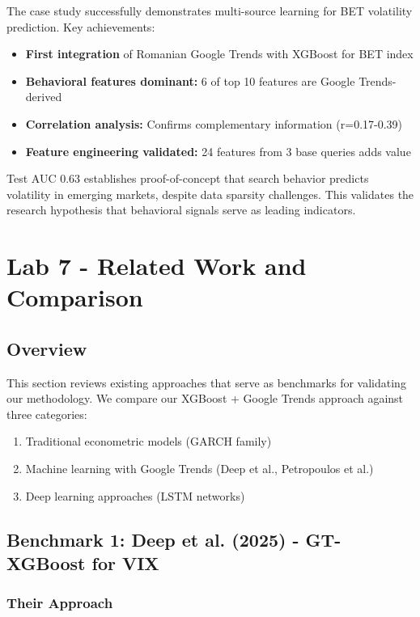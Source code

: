 \documentclass[12pt,a4paper]{article}
\begin{document}
The case study successfully demonstrates multi-source learning for BET volatility prediction. Key achievements:

\begin{itemize}
    \item \textbf{First integration} of Romanian Google Trends with XGBoost for BET index
    \item \textbf{Behavioral features dominant:} 6 of top 10 features are Google Trends-derived
    \item \textbf{Correlation analysis:} Confirms complementary information (r=0.17-0.39)
    \item \textbf{Feature engineering validated:} 24 features from 3 base queries adds value
\end{itemize}

Test AUC 0.63 establishes proof-of-concept that search behavior predicts volatility in emerging markets, despite data sparsity challenges. This validates the research hypothesis that behavioral signals serve as leading indicators.

\newpage
\section{Lab 7 - Related Work and Comparison}

\subsection{Overview}

This section reviews existing approaches that serve as benchmarks for validating our methodology. We compare our XGBoost + Google Trends approach against three categories:

\begin{enumerate}
    \item Traditional econometric models (GARCH family)
    \item Machine learning with Google Trends (Deep et al., Petropoulos et al.)
    \item Deep learning approaches (LSTM networks)
\end{enumerate}

\subsection{Benchmark 1: Deep et al. (2025) - GT-XGBoost for VIX}

\subsubsection{Their Approach}
\end{document}
